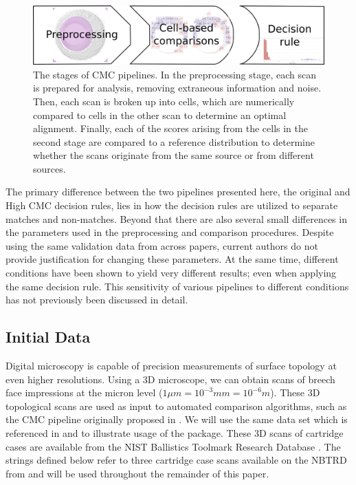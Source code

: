 \begin{figure}
\centering
\includegraphics[width=.8\textwidth]{images/overview-flow.png}
\caption{The stages of CMC pipelines. In the preprocessing stage, each scan is prepared for analysis, removing extraneous information and noise. Then, each scan is broken up into cells, which are numerically compared to cells in the other scan to determine an optimal alignment. Finally, each of the scores arising from the cells in the second stage are compared to a reference distribution to determine whether the scans originate from the same source or from different sources.\label{fig:overview-flow}}
\end{figure}

The primary difference between the two pipelines presented here, the
original and High CMC decision rules, lies in how the decision rules are
utilized to separate matches and non-matches. Beyond that there are also
several small differences in the parameters used in the preprocessing
and comparison procedures. Despite using the same validation data from
\citet{fadul_empirical_2011} across papers, current authors do not
provide justification for changing these parameters. At the same time,
different conditions have been shown to yield very different results;
even when applying the same decision rule. This sensitivity of various
pipelines to different conditions has not previously been discussed in
detail.

\hypertarget{initialData}{%
\subsection{Initial Data}\label{initialData}}

Digital microscopy is capable of precision measurements of surface
topology at even higher resolutions. Using a 3D microscope, we can
obtain scans of breech face impressions at the micron level
(\(1 \mu m = 10^{-3} mm = 10^{-6} m\)). These 3D topological scans are
used as input to automated comparison algorithms, such as the CMC
pipeline originally proposed in \citet{song_proposed_2013}. We will use
the same data set which is referenced in \citet{song_3d_2014} and
\citet{tong_improved_2015} to illustrate usage of the 
package. These 3D scans of cartridge cases are available from the NIST
Ballistics Toolmark Research Database \citep[NBTRD;][]{nbtrd}. The
strings defined below refer to three cartridge case scans available on
the NBTRD from \citet{fadul_empirical_2011} and will be used throughout
the remainder of this paper.

